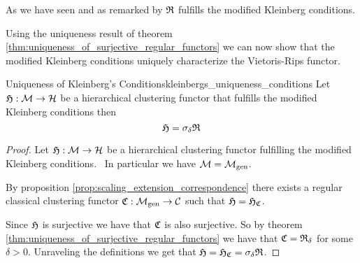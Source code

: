As we have seen and as remarked by \cite{Carlsson2010} $\mathfrak{R}$ fulfills the modified Kleinberg conditions.

Using the uniqueness result of theorem \ref{thm:uniqueness_of_surjective_regular_functors} we can now show that the modified Kleinberg conditions uniquely characterize the Vietoris-Rips functor.

\begin{theorem}{Uniqueness of Kleinberg's Conditions}{kleinbergs_uniqueness_conditions}
    Let $\mathfrak{H}: \mathcal{M} \to \mathcal{H}$ be a hierarchical clustering functor that fulfills the modified Kleinberg conditions then
    $$
    \mathfrak{H} = \sigma_\delta \mathfrak{R}
    $$
\end{theorem}

\begin{proof}
Let $\mathfrak{H}: \mathcal{M} \to \mathcal{H}$ be a hierarchical clustering functor fulfilling the modified Kleinberg conditions. \Ie\ In particular we have $\mathcal{M} = {\mathcal{M}_\mathrm{gen}}$.

By proposition \ref{prop:scaling_extension_correspondence} there exists a regular classical clustering functor $\mathfrak{C}: {\mathcal{M}_\mathrm{gen}} \to \mathcal{C}$ such that $\mathfrak{H} = \mathfrak{H}_{\mathfrak{C}}$.

Since $\mathfrak{H}$ is surjective we have that $\mathfrak{C}$ is also surjective. So by theorem \ref{thm:uniqueness_of_surjective_regular_functors} we have that $\mathfrak{C} = \mathfrak{R}_\delta$ for some $\delta > 0$. Unraveling the definitions we get that $\mathfrak{H} = \mathfrak{H}_{\mathfrak{C}} = \sigma_\delta \mathfrak{R}$.
\end{proof}
